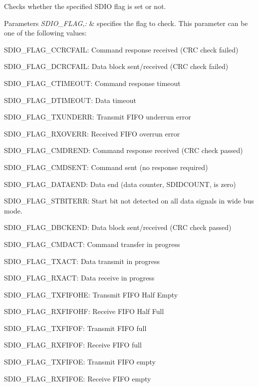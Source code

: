 Checks whether the specified S\-D\-I\-O flag is set or not. 


\begin{DoxyParams}{Parameters}
{\em S\-D\-I\-O\-\_\-\-F\-L\-A\-G,\-:} & specifies the flag to check. This parameter can be one of the following values\-: \begin{DoxyItemize}
\item S\-D\-I\-O\-\_\-\-F\-L\-A\-G\-\_\-\-C\-C\-R\-C\-F\-A\-I\-L\-: Command response received (C\-R\-C check failed) \item S\-D\-I\-O\-\_\-\-F\-L\-A\-G\-\_\-\-D\-C\-R\-C\-F\-A\-I\-L\-: Data block sent/received (C\-R\-C check failed) \item S\-D\-I\-O\-\_\-\-F\-L\-A\-G\-\_\-\-C\-T\-I\-M\-E\-O\-U\-T\-: Command response timeout \item S\-D\-I\-O\-\_\-\-F\-L\-A\-G\-\_\-\-D\-T\-I\-M\-E\-O\-U\-T\-: Data timeout \item S\-D\-I\-O\-\_\-\-F\-L\-A\-G\-\_\-\-T\-X\-U\-N\-D\-E\-R\-R\-: Transmit F\-I\-F\-O underrun error \item S\-D\-I\-O\-\_\-\-F\-L\-A\-G\-\_\-\-R\-X\-O\-V\-E\-R\-R\-: Received F\-I\-F\-O overrun error \item S\-D\-I\-O\-\_\-\-F\-L\-A\-G\-\_\-\-C\-M\-D\-R\-E\-N\-D\-: Command response received (C\-R\-C check passed) \item S\-D\-I\-O\-\_\-\-F\-L\-A\-G\-\_\-\-C\-M\-D\-S\-E\-N\-T\-: Command sent (no response required) \item S\-D\-I\-O\-\_\-\-F\-L\-A\-G\-\_\-\-D\-A\-T\-A\-E\-N\-D\-: Data end (data counter, S\-D\-I\-D\-C\-O\-U\-N\-T, is zero) \item S\-D\-I\-O\-\_\-\-F\-L\-A\-G\-\_\-\-S\-T\-B\-I\-T\-E\-R\-R\-: Start bit not detected on all data signals in wide bus mode. \item S\-D\-I\-O\-\_\-\-F\-L\-A\-G\-\_\-\-D\-B\-C\-K\-E\-N\-D\-: Data block sent/received (C\-R\-C check passed) \item S\-D\-I\-O\-\_\-\-F\-L\-A\-G\-\_\-\-C\-M\-D\-A\-C\-T\-: Command transfer in progress \item S\-D\-I\-O\-\_\-\-F\-L\-A\-G\-\_\-\-T\-X\-A\-C\-T\-: Data transmit in progress \item S\-D\-I\-O\-\_\-\-F\-L\-A\-G\-\_\-\-R\-X\-A\-C\-T\-: Data receive in progress \item S\-D\-I\-O\-\_\-\-F\-L\-A\-G\-\_\-\-T\-X\-F\-I\-F\-O\-H\-E\-: Transmit F\-I\-F\-O Half Empty \item S\-D\-I\-O\-\_\-\-F\-L\-A\-G\-\_\-\-R\-X\-F\-I\-F\-O\-H\-F\-: Receive F\-I\-F\-O Half Full \item S\-D\-I\-O\-\_\-\-F\-L\-A\-G\-\_\-\-T\-X\-F\-I\-F\-O\-F\-: Transmit F\-I\-F\-O full \item S\-D\-I\-O\-\_\-\-F\-L\-A\-G\-\_\-\-R\-X\-F\-I\-F\-O\-F\-: Receive F\-I\-F\-O full \item S\-D\-I\-O\-\_\-\-F\-L\-A\-G\-\_\-\-T\-X\-F\-I\-F\-O\-E\-: Transmit F\-I\-F\-O empty \item S\-D\-I\-O\-\_\-\-F\-L\-A\-G\-\_\-\-R\-X\-F\-I\-F\-O\-E\-: Receive F\-I\-F\-O empty \item 
\end{DoxyItemize}
\end{DoxyParams}
